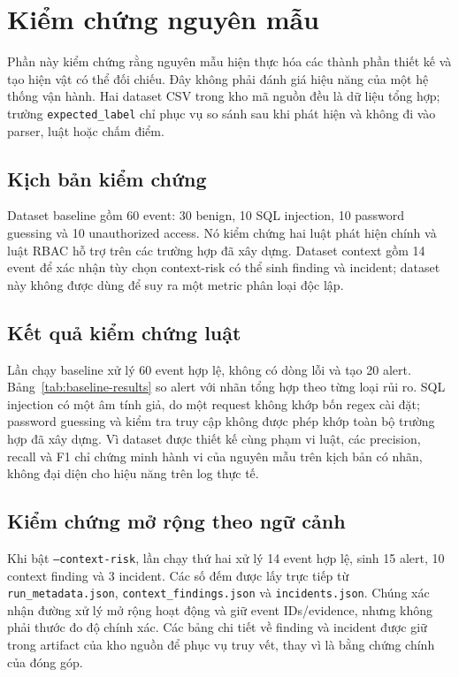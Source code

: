 \section{Kiểm chứng nguyên mẫu}
\label{sec:evaluation}

Phần này kiểm chứng rằng nguyên mẫu hiện thực hóa các thành phần thiết kế và
tạo hiện vật có thể đối chiếu. Đây không phải đánh giá hiệu năng của một hệ
thống vận hành. Hai dataset CSV trong kho mã nguồn đều là dữ liệu tổng hợp;
trường \texttt{expected\_label} chỉ phục vụ so sánh sau khi phát hiện và không
đi vào parser, luật hoặc chấm điểm.

\subsection{Kịch bản kiểm chứng}
\label{subsec:datasets}

Dataset baseline gồm 60 event: 30 benign, 10 SQL injection, 10 password
guessing và 10 unauthorized access. Nó kiểm chứng hai luật phát hiện chính và
luật RBAC hỗ trợ trên các trường hợp đã xây dựng. Dataset context gồm 14 event
để xác nhận tùy chọn context-risk có thể sinh finding và incident; dataset này
không được dùng để suy ra một metric phân loại độc lập.



\subsection{Kết quả kiểm chứng luật}
\label{subsec:results}

Lần chạy baseline xử lý 60 event hợp lệ, không có dòng lỗi và tạo 20 alert.
Bảng~\ref{tab:baseline-results} so alert với nhãn tổng hợp theo từng loại rủi
ro. SQL injection có một âm tính giả, do một request không khớp bốn regex cài
đặt; password guessing và kiểm tra truy cập không được phép khớp toàn bộ trường
hợp đã xây dựng. Vì dataset được thiết kế cùng phạm vi luật, các precision,
recall và F1 chỉ chứng minh hành vi của nguyên mẫu trên kịch bản có nhãn, không
đại diện cho hiệu năng trên log thực tế.



\subsection{Kiểm chứng mở rộng theo ngữ cảnh}

Khi bật \texttt{--context-risk}, lần chạy thứ hai xử lý 14 event hợp lệ, sinh
15 alert, 10 context finding và 3 incident. Các số đếm được lấy trực tiếp từ
\texttt{run\_metadata.json}, \texttt{context\_findings.json} và
\texttt{incidents.json}. Chúng xác nhận đường xử lý mở rộng hoạt động và giữ
event IDs/evidence, nhưng không phải thước đo độ chính xác. Các bảng chi tiết
về finding và incident được giữ trong artifact của kho nguồn để phục vụ truy
vết, thay vì là bằng chứng chính của đóng góp.

